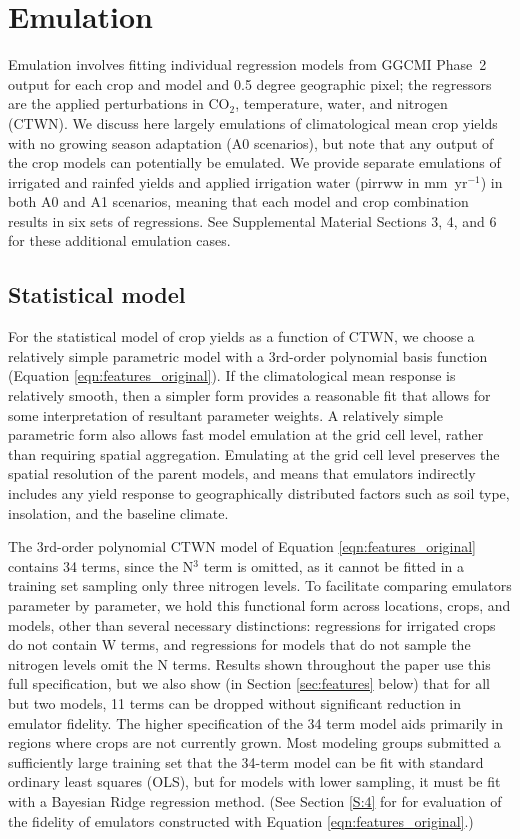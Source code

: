 \documentclass[gmdd]{copernicus} %
\begin{document}
\section{Emulation}
\label{S:3}
Emulation involves fitting individual regression models from GGCMI Phase~2 output for each crop and model and 0.5 degree geographic pixel; the regressors are the applied perturbations in CO$_2$, temperature, water, and nitrogen (CTWN). 
We discuss here largely emulations of climatological mean crop yields with no growing season adaptation (A0 scenarios), but note that any output of the crop models can potentially be emulated. 
We provide separate emulations of irrigated and rainfed yields and applied irrigation water (pirrww in mm\ yr$^{-1}$) in both A0 and A1 scenarios, meaning that each model and crop combination results in six sets of regressions. See Supplemental Material Sections 3, 4, and 6 for these additional emulation cases.

\subsection{Statistical model}
For the statistical model of crop yields as a function of CTWN, we choose a relatively simple parametric model with a 3rd-order polynomial basis function (Equation \ref{eqn:features_original}).
If the climatological mean response is relatively smooth, then a simpler form provides a reasonable fit that allows for some interpretation of resultant parameter weights. 
A relatively simple parametric form also allows fast model emulation at the grid cell level, rather than requiring spatial aggregation. 
Emulating at the grid cell level preserves the spatial resolution of the parent models, and means that emulators indirectly includes any yield response to geographically distributed factors such as soil type, insolation, and the baseline climate.

The 3rd-order polynomial CTWN model of Equation \ref{eqn:features_original} contains 34 terms, since the N$^3$ term is omitted, as it cannot be fitted in a training set sampling only three nitrogen levels. 
To facilitate comparing emulators parameter by parameter, we hold this functional form across locations, crops, and models, other than several necessary distinctions: regressions for irrigated crops do not contain W terms, and regressions for models that do not sample the nitrogen levels omit the N terms. 
Results shown throughout the paper use this full specification, but we also show (in Section \ref{sec:features} below) that for all but two models, 11 terms can be dropped without significant reduction in emulator fidelity. The higher specification of the 34 term model aids primarily in regions where crops are not currently grown. Most modeling groups submitted a sufficiently large training set that the 34-term model can be fit with standard ordinary least squares (OLS), but for models with lower sampling, it must be fit with a Bayesian Ridge regression method. (See Section \ref{S:4} for 
for evaluation of the fidelity of emulators constructed with Equation \ref{eqn:features_original}.)
\end{document}
